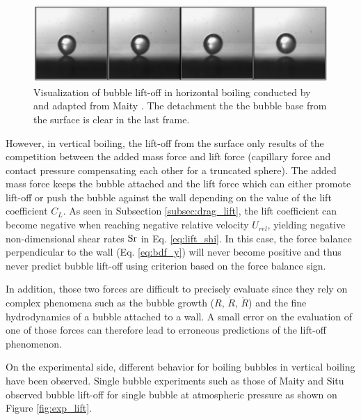 \begin{figure}[h!]
\centering
\includegraphics[width=0.7\linewidth]{img/bub_dyn/lift-off/lift_exp_hor_maity.PNG}
\caption{Visualization of bubble lift-off in horizontal boiling conducted by and adapted from Maity \cite{maity_effect_2000}. The detachment the the bubble base from the surface is clear in the last frame.} 
\label{fig:exp_lift_hor_maity}
\end{figure}

\npar

However, in vertical boiling, the lift-off from the surface only results of the competition between the added mass force and lift force (capillary force and contact pressure compensating each other for a truncated sphere). The added mass force keeps the bubble attached and the lift force which can either promote lift-off or push the bubble against the wall depending on the value of the lift coefficient $C_{L}$. As seen in Subsection \ref{subsec:drag_lift}, the lift coefficient can become negative when reaching negative relative velocity $U_{rel}$, yielding negative non-dimensional shear rates $\mathrm{Sr}$ in Eq. \ref{eq:lift_shi}. In this case, the force balance perpendicular to the wall (Eq. \ref{eq:bdf_y}) will never become positive and thus never predict bubble lift-off using criterion based on the force balance sign.

In addition, those two forces are difficult to precisely evaluate since they rely on complex phenomena such as the bubble growth ($R$, $\dot{R}$, $\ddot{R}$) and the fine hydrodynamics of a bubble attached to a wall. A small error on the evaluation of one of those forces can therefore lead to erroneous predictions of the lift-off phenomenon.

\npar

On the experimental side, different behavior for boiling bubbles in vertical boiling have been observed. Single bubble experiments such as those of Maity \cite{maity_effect_2000} and Situ \etal \cite{situ_bubble_2005} observed bubble lift-off for single bubble at atmospheric pressure as shown on Figure \ref{fig:exp_lift}.


